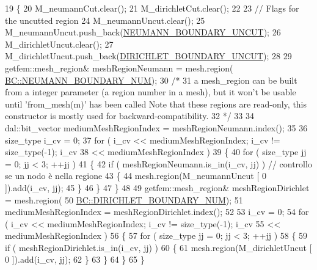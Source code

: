 \begin{DoxyCode}
19 \{
20     M\_neumannCut.clear();
21     M\_dirichletCut.clear();
22 
23     \textcolor{comment}{// Flags for the uncutted region}
24     M\_neumannUncut.clear();
25     M\_neumannUncut.push\_back(\hyperlink{classBCHandler_a2bc86209db0836dbc6ca56e1ca4e4ac1aa538eee48606669ac37073ca65144007}{NEUMANN\_BOUNDARY\_UNCUT});
26     M\_dirichletUncut.clear();
27     M\_dirichletUncut.push\_back(\hyperlink{classBCHandler_a2bc86209db0836dbc6ca56e1ca4e4ac1a487ba8af2086045d8b0df840b2525866}{DIRICHLET\_BOUNDARY\_UNCUT});
28 
29     getfem::mesh\_region& meshRegionNeumann = mesh.region(
      \hyperlink{classBC_ad1b507696802f73b95c0ca59f4c41390a432aa77a00d8eb4929463ef8d57b5c04}{BC::NEUMANN\_BOUNDARY\_NUM});
30 \textcolor{comment}{/*}
31 \textcolor{comment}{a mesh\_region can be built from a integer parameter (a region number in a mesh), but it won't be usable
       until 'from\_mesh(m)' has been called Note that these regions are read-only, this constructor is mostly used for
       backward-compatibility.}
32 \textcolor{comment}{*/}
33 
34     dal::bit\_vector mediumMeshRegionIndex = meshRegionNeumann.index();
35 
36     size\_type i\_cv = 0;
37     \textcolor{keywordflow}{for} ( i\_cv << mediumMeshRegionIndex; i\_cv != size\_type(-1); i\_cv
38             << mediumMeshRegionIndex )
39     \{
40         \textcolor{keywordflow}{for} ( size\_type jj = 0; jj < 3; ++jj )
41         \{
42             \textcolor{keywordflow}{if} ( meshRegionNeumann.is\_in(i\_cv, jj) ) \textcolor{comment}{// controllo se un nodo è nella regione}
43             \{
44                 mesh.region(M\_neumannUncut [ 0 ]).add(i\_cv, jj);
45             \}
46         \}
47     \}
48 
49     getfem::mesh\_region& meshRegionDirichlet = mesh.region(
50             \hyperlink{classBC_ad1b507696802f73b95c0ca59f4c41390a99103ccd54ba29b1bd2670cc6cd0c462}{BC::DIRICHLET\_BOUNDARY\_NUM});
51     mediumMeshRegionIndex = meshRegionDirichlet.index();
52 
53     i\_cv = 0;
54     \textcolor{keywordflow}{for} ( i\_cv << mediumMeshRegionIndex; i\_cv != size\_type(-1); i\_cv
55             << mediumMeshRegionIndex )
56     \{
57         \textcolor{keywordflow}{for} ( size\_type jj = 0; jj < 3; ++jj )
58         \{
59             \textcolor{keywordflow}{if} ( meshRegionDirichlet.is\_in(i\_cv, jj) )
60             \{
61                 mesh.region(M\_dirichletUncut [ 0 ]).add(i\_cv, jj);
62             \}
63         \}
64     \}
65 \}
\end{DoxyCode}
